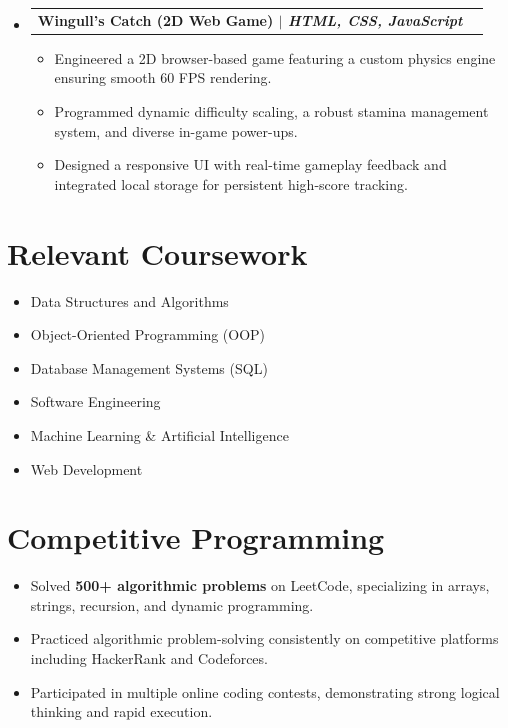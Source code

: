 \documentclass[11pt,a4paper]{article}
\makeatletter
\newcommand{\resumeProjectHeading}[2]{
    \begin{tabular*}{1\textwidth}[t]{l@{\extracolsep{\fill}}r}
      \textbf{#1} & \textit{#2} \\
    \end{tabular*}\vspace{-4pt}
}
\makeatother
\begin{document}
\begin{itemize}[leftmargin=0in, label={}, itemsep=4pt]
  \item \resumeProjectHeading
    {Wingull's Catch (2D Web Game) $|$ \normalfont\textit{HTML, CSS, JavaScript}}{}
    \begin{itemize}[leftmargin=0.15in, label={\textbullet}, topsep=2pt, itemsep=0pt]
      \item \small{Engineered a 2D browser-based game featuring a custom physics engine ensuring smooth 60 FPS rendering.}
      \item \small{Programmed dynamic difficulty scaling, a robust stamina management system, and diverse in-game power-ups.}
      \item \small{Designed a responsive UI with real-time gameplay feedback and integrated local storage for persistent high-score tracking.}
    \end{itemize}
\end{itemize}

\section{Relevant Coursework}
\vspace{2pt}
\begin{itemize}[leftmargin=0.15in, label={\textbullet}, noitemsep, topsep=0pt]
    \item \small{Data Structures and Algorithms}
    \item \small{Object-Oriented Programming (OOP)}
    \item \small{Database Management Systems (SQL)}
    \item \small{Software Engineering}
    \item \small{Machine Learning \& Artificial Intelligence}
    \item \small{Web Development}
\end{itemize}
\vspace{-4pt}

\section{Competitive Programming}
\vspace{2pt}
\begin{itemize}[leftmargin=0.15in, label={\textbullet}, noitemsep, topsep=0pt]
    \item \small{Solved \textbf{500+ algorithmic problems} on LeetCode, specializing in arrays, strings, recursion, and dynamic programming.}
    \item \small{Practiced algorithmic problem-solving consistently on competitive platforms including HackerRank and Codeforces.}
    \item \small{Participated in multiple online coding contests, demonstrating strong logical thinking and rapid execution.}
\end{itemize}
\vspace{-4pt}
\end{document}
